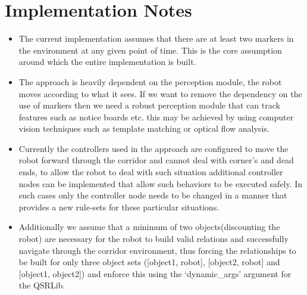 \section{Implementation Notes}
\begin{itemize}
	\item The current implementation assumes that there are at least two markers in the environment at any given point of time. This is the core assumption around which the entire implementation is built.
	
	\item The approach is heavily dependent on the perception module, the robot moves according to what it sees. If we want to remove the dependency on the use of markers then we need a robust perception module that can track features such as notice boards etc. this may be achieved by using computer vision techniques such as template matching or optical flow analysis.
	
	\item Currently the controllers used in the approach are configured to move the robot forward through the corridor and cannot deal with corner's and dead ends, to allow the robot to deal with such situation additional controller nodes can be implemented that allow such behaviors to be executed safely. In such cases only the controller node needs to be changed in a manner that provides a new rule-sets for these particular situations. 
	
	\item Additionally we assume that a minimum of two objects(discounting the robot) are necessary for the robot to build valid relations and successfully navigate through the corridor environment, thus forcing the relationships to be built for only three object sets ([object1, robot], [object2, robot] and [object1, object2]) and enforce this using the `dynamic\_args' argument for the QSRLib.
\end{itemize}
